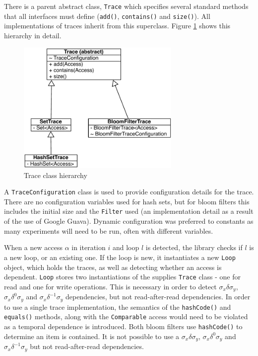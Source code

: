 		There is a parent abstract class, \texttt{Trace} which specifies several standard methods that all interfaces must define (\texttt{add()}, \texttt{contains()} and \texttt{size()}). All implementations of traces inherit from this superclass. Figure \ref{fig:trace-classes} shows this hierarchy in detail.
		
		\begin{figure}
			\centering
			\includegraphics[width=0.7\textwidth]{graphics/trace-classes.pdf}
			\caption{Trace class hierarchy}
			\label{fig:trace-classes}
		\end{figure}
		
		A \texttt{TraceConfiguration} class is used to provide configuration details for the trace. There are no configuration variables used for hash sets, but for bloom filters this includes the initial size and the \texttt{Filter} used (an implementation detail as a result of the use of Google Guava). Dynamic configuration was preferred to constants as many experiments will need to be run, often with different variables.
		
		When a new access $\alpha$ in iteration $i$ and loop $l$ is detected, the library checks if $l$ is a new loop, or an existing one. If the loop is new, it instantiates a new \texttt{Loop} object, which holds the traces, as well as detecting whether an access is dependent. \texttt{Loop} stores two instantiations of the supplies \texttt{Trace} class - one for read and one for write operations. This is necessary in order to detect $\sigma_x \delta \sigma_y$, $\sigma_x \delta^0 \sigma_y$ and $\sigma_x \delta^{-1} \sigma_y$ dependencies, but not read-after-read dependencies. In order to use a single trace implementation, the semantics of the \texttt{hashCode()} and \texttt{equals()} methods, along with the \texttt{Comparable} access would need to be violated as a temporal dependence is introduced. Both bloom filters use \texttt{hashCode()} to determine an item is contained. It is not possible to use a $\sigma_x \delta \sigma_y$, $\sigma_x \delta^0 \sigma_y$ and $\sigma_x \delta^{-1} \sigma_y$ but not read-after-read dependencies.
		
